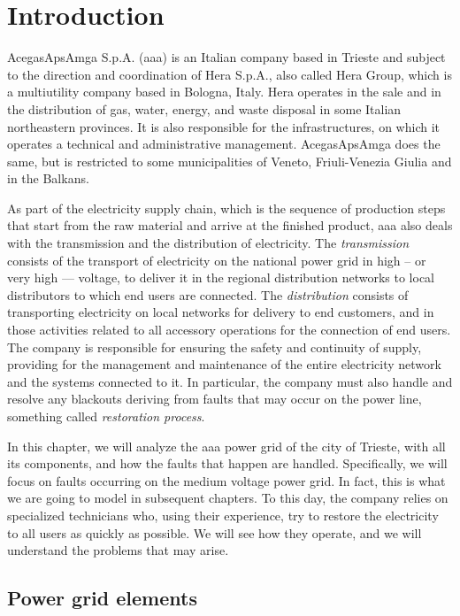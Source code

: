 \chapter{Introduction}


AcegasApsAmga S.p.A. (\acrshort{aaa}) is an Italian company based in Trieste and subject to the direction and coordination of Hera S.p.A., also called Hera Group, which is a multiutility company based in Bologna, Italy. Hera operates in the sale and in the distribution of gas, water, energy, and waste disposal in some Italian northeastern provinces. It is also responsible for the infrastructures, on which it operates a technical and administrative management. AcegasApsAmga does the same, but is restricted to some municipalities of Veneto, Friuli-Venezia Giulia and in the Balkans.

As part of the electricity supply chain, which is the sequence of production steps that start from the raw material and arrive at the finished product, \acrshort{aaa} also deals with the transmission and the distribution of electricity. The \emph{transmission} consists of the transport of electricity on the national power grid in high -- or very high --- voltage, to deliver it in the regional distribution networks to local distributors to which end users are connected. The \emph{distribution} consists of transporting electricity on local networks for delivery to end customers, and in those activities related to all accessory operations for the connection of end users. The company is responsible for ensuring the safety and continuity of supply, providing for the management and maintenance of the entire electricity network and the systems connected to it. In particular, the company must also handle and resolve any blackouts deriving from faults that may occur on the power line, something called \emph{restoration process}.

In this chapter, we will analyze the \acrshort{aaa} power grid of the city of Trieste, with all its components, and how the faults that happen are handled. Specifically, we will focus on faults occurring on the medium voltage power grid. In fact, this is what we are going to model in subsequent chapters. To this day, the company relies on specialized technicians who, using their experience, try to restore the electricity to all users as quickly as possible. We will see how they operate, and we will understand the problems that may arise.


\section{Power grid elements} %

